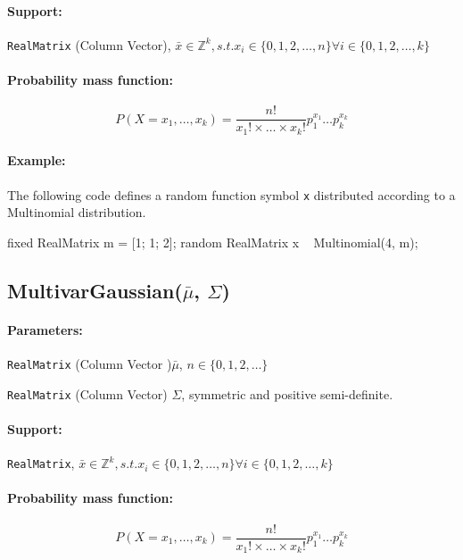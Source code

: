 \paragraph*{Support:} \verb|RealMatrix| (Column Vector), $\bar{x} \in \mathbb{Z}^{k}, s.t. x_{i} \in \{0, 1, 2, \ldots, n \} \forall i \in \{0, 1, 2, \ldots, k \}  $ 

\paragraph*{Probability mass function:}
\[
	P(X = x_{1},\ldots,x_{k}) = \frac{n!}{x_{1}! \times \ldots \times x_{k}!} p_{1}^{x_{1}} \ldots p_{k}^{x_{k}}
\]

\paragraph*{Example:}
The following code defines a random function symbol \verb|x| distributed according to a Multinomial distribution.
\begin{blogcode}
fixed RealMatrix m = [1; 1; 2];
random RealMatrix x ~ Multinomial(4, m);
\end{blogcode}

\subsection{MultivarGaussian($\bar{\mu}$, $\Sigma$)}

\paragraph*{Parameters:} 
\begin{itemize*}
\item[] \verb|RealMatrix| (Column Vector )$\bar{\mu}$, $n \in \{0, 1, 2, \ldots \}$

\item[] \verb|RealMatrix| (Column Vector) $\Sigma$, symmetric and positive semi-definite.

\end{itemize*}

\paragraph*{Support:} \verb|RealMatrix|, $\bar{x} \in \mathbb{Z}^{k}, s.t. x_{i} \in \{0, 1, 2, \ldots, n \} \forall i \in \{0, 1, 2, \ldots, k \}  $ 

\paragraph*{Probability mass function:}
\[
	P(X = x_{1},\ldots,x_{k}) = \frac{n!}{x_{1}! \times \ldots \times x_{k}!} p_{1}^{x_{1}} \ldots p_{k}^{x_{k}}
\]

